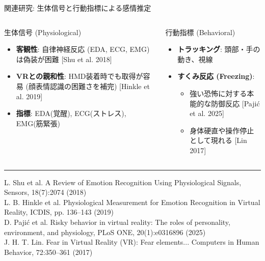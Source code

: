 \documentclass[aspectratio=169,10pt]{beamer}
\begin{document}
\begin{frame}{関連研究: 生体信号と行動指標による感情推定}
\begin{columns}[T]
\begin{block}{生体信号 (Physiological)}
\begin{itemize}
\item \textbf{客観性}: 自律神経反応 (EDA, ECG, EMG) は偽装が困難 [Shu et al. 2018]
\item \textbf{VRとの親和性}: HMD装着時でも取得が容易 (顔表情認識の困難さを補完) [Hinkle et al. 2019]
\item \textbf{指標}: EDA(覚醒), ECG(ストレス), EMG(筋緊張)
\end{itemize}
\end{block}

\begin{block}{行動指標 (Behavioral)}
\begin{itemize}
\item \textbf{トラッキング}: 頭部・手の動き、視線
\item \textbf{すくみ反応 (Freezing)}: 
\begin{itemize}
\item 強い恐怖に対する本能的な防御反応 [Pajić et al. 2025]
\item 身体硬直や操作停止として現れる [Lin 2017]
\end{itemize}
\end{itemize}
\end{block}
\end{columns}

\vspace{0.1cm}
\hrule
\vspace{0.1cm}
\tiny
\noindent [Shu et al. 2018] L. Shu et al. A Review of Emotion Recognition Using Physiological Signals, Sensors, 18(7):2074 (2018)\\
\noindent [Hinkle et al. 2019] L. B. Hinkle et al. Physiological Measurement for Emotion Recognition in Virtual Reality, ICDIS, pp. 136–143 (2019)\\
\noindent [Pajić et al. 2025] D. Pajić et al. Risky behavior in virtual reality: The roles of personality, environment, and physiology, PLoS ONE, 20(1):e0316896 (2025)\\
\noindent [Lin 2017] J. H. T. Lin. Fear in Virtual Reality (VR): Fear elements... Computers in Human Behavior, 72:350–361 (2017)
\end{frame}
\end{document}
